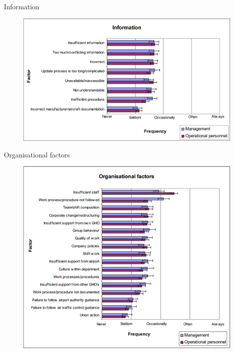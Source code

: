 \begin{frame}{Information}{}
	\begin{figure}[H]
	\centering
	\includegraphics[width=\textwidth]{Grafik/Information}
\end{figure}
\end{frame}

\begin{frame}{Organisational factors}{}
	\begin{figure}[H]
	\centering
	\includegraphics[width=\textwidth]{Grafik/OrganisationalFactors}
\end{figure}
\end{frame}